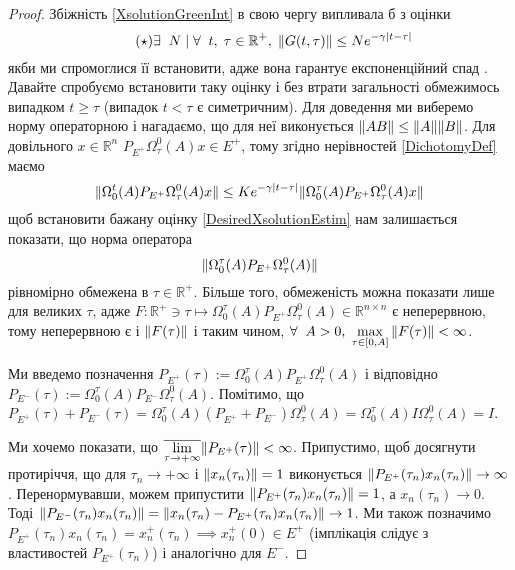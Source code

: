 \documentclass[14pt]{extarticle} %
\let\oldforall\forall
\renewcommand{\forall}{\oldforall\;}
\let\oldexists\exists
\renewcommand{\exists}{\oldexists\;}
\begin{document}
\begin{proof}
	Збіжність \ref{XsolutionGreenInt} в свою чергу випливала б з оцінки
	\[\label{DesiredXsolutionEstim}
	\tag{$\star$}\exists N\mid \forall t,\;\tau\in\mathbb{R}^+,\;\mynorm{G(t,\tau)}\leq Ne^{-\gamma\myabs{t-\tau}}\]
	якби ми спромоглися її встановити, адже вона гарантує експоненційний спад
	. Давайте спробуємо встановити таку оцінку і без втрати загальності обмежимось випадком $t\geq\tau$ (випадок
	$t<\tau$ є симетричним). Для доведення ми виберемо норму операторною 
	і нагадаємо, що для неї виконується $\|AB\|\leq\|A\|\|
	B\|$.
	Для довільного $x\in\mathbb{R}^n$ $P_{E^+}\Omega^0_{\tau}(A)x\in E^+$, тому згідно нерівностей \ref{DichotomyDef}
	маємо
	\[\|\Omega_0^t(A) P_{E^+} \Omega^0_{\tau}(A)x\|\leq Ke^{-\gamma\left|t-\tau\right|}\|\Omega_0^{\tau}(A) P_{E^+} \Omega^0_{\tau}(A)x\|\]
	щоб встановити бажану оцінку \ref{DesiredXsolutionEstim} нам залишається показати, що норма оператора 
	\[\|\Omega_0^{\tau}(A) P_{E^+} \Omega^0_{\tau}(A)\|\]
	рівномірно обмежена в $\tau\in\mathbb{R}^+$. Більше того, обмеженість можна показати лише для великих $\tau$, адже 
	$F:\mathbb{R^+}\ni \tau\mapsto\Omega_0^{\tau}(A) P_{E^+} \Omega^0_{\tau}(A)\in\mathbb{R}^{n\times n}
	$ є неперервною, тому неперервною є і $\|F(\tau)\|$ і
	таким чином, $\forall A>0,\;\max_{\tau\in[0,A]}\mynorm{F(\tau)}<\infty$. 

	Ми введемо позначення $P_{E^+}(\tau):=	\Omega_0^{\tau}(A) P_{E^+} \Omega^0_{\tau}(A)$ і відповідно 
	$P_{E^-}(\tau):=\Omega_0^{\tau}(A) P_{E^-} \Omega^0_{\tau}(A)$. Помітимо, що $P_{E^+}(\tau)+P_{E^-}(\tau)=
	\Omega_0^{\tau}(A) (P_{E^+}+P_{E^-}) \Omega^0_{\tau}(A)=\Omega_0^{\tau}(A)I\Omega^0_{\tau}(A)=I$. 
	
	Ми хочемо показати,
	що $\overline{\lim_{\tau\to+\infty}}\mynorm{P_{E^+}(\tau)}<\infty$. Припустимо, щоб досягнути протиріччя, що для
	$\tau_n\to+\infty$ і $\|x_n(\tau_n)\|=1$ виконується $\|P_{E^+}(\tau_n)x_n(\tau_n)\|\to\infty$. Перенормувавши, можем припустити
	$\|P_{E^+}(\tau_n)x_n(\tau_n)\|=1$, а $x_n(\tau_n)\to 0$. 
	Тоді $\|P_{E^-}(\tau_n)x_n(\tau_n)\|=\|x_n(\tau_n)-P_{E^+}(\tau_n)x_n(\tau_n)\|\to 1$. Ми також
	позначимо $P_{E^+}(\tau_n)x_n(\tau_n)=x^+_n(\tau_n)\implies x^+_n(0)\in E^+$ (імплікація слідує
	з властивостей $P_{E^+}(\tau_n)$) і аналогічно для $E^-$.


\end{proof}
\end{document}
